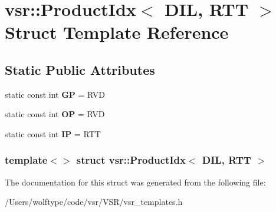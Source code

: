 \hypertarget{structvsr_1_1_product_idx_3_01_d_i_l_00_01_r_t_t_01_4}{\section{vsr\-:\-:Product\-Idx$<$ D\-I\-L, R\-T\-T $>$ Struct Template Reference}
\label{structvsr_1_1_product_idx_3_01_d_i_l_00_01_r_t_t_01_4}
}
\subsection*{Static Public Attributes}
\begin{DoxyCompactItemize}
\item 
\hypertarget{structvsr_1_1_product_idx_3_01_d_i_l_00_01_r_t_t_01_4_a324ff05886ecfc9e6f030fa972b3f21c}{static const int {\bfseries G\-P} = R\-V\-D}\label{structvsr_1_1_product_idx_3_01_d_i_l_00_01_r_t_t_01_4_a324ff05886ecfc9e6f030fa972b3f21c}

\item 
\hypertarget{structvsr_1_1_product_idx_3_01_d_i_l_00_01_r_t_t_01_4_aa0f11ccf7682966110496ade1d53dee6}{static const int {\bfseries O\-P} = R\-V\-D}\label{structvsr_1_1_product_idx_3_01_d_i_l_00_01_r_t_t_01_4_aa0f11ccf7682966110496ade1d53dee6}

\item 
\hypertarget{structvsr_1_1_product_idx_3_01_d_i_l_00_01_r_t_t_01_4_a887c1e622365097a5a0e22a2cccf03e5}{static const int {\bfseries I\-P} = R\-T\-T}\label{structvsr_1_1_product_idx_3_01_d_i_l_00_01_r_t_t_01_4_a887c1e622365097a5a0e22a2cccf03e5}

\end{DoxyCompactItemize}
\subsubsection*{template$<$$>$ struct vsr\-::\-Product\-Idx$<$ D\-I\-L, R\-T\-T $>$}



The documentation for this struct was generated from the following file\-:\begin{DoxyCompactItemize}
\item 
/\-Users/wolftype/code/vsr/\-V\-S\-R/vsr\-\_\-templates.\-h\end{DoxyCompactItemize}
